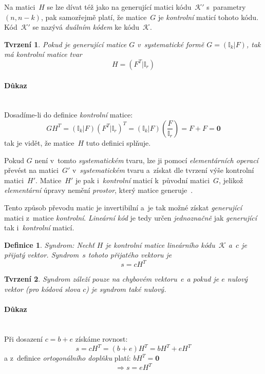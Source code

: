 \documentclass[thesis=M,czech,hidelinks]{FITthesis}[2012/06/26]
\newcommand{\0}{{\textcolor[gray]{0.75}{0}}}
\newtheorem{tvrzeni}{Tvrzení}
\newtheorem{definice}{Definice}
\begin{document}
Na matici~$H$ se lze dívat též jako na generující matici kódu~$\mathcal{K}'$
s~parametry~$(n,n-k)$, pak samozřejmě platí, že matice~$G$ je \emph{kontrolní}
maticí tohoto kódu. Kód~$\mathcal{K}'$ se nazývá \emph{duálním kódem} ke
kódu~$\mathcal{K}$.

\begin{tvrzeni}
    Pokud je \emph{generující} matice $G$ v~systematické formě
    $G=(\mathbb{I}_k|F)$, tak má \emph{kontrolní} matice tvar
    $$ H=(F^T|\mathbb{I}_r) $$
\end{tvrzeni}


\paragraph{Důkaz} \hfil \\
Dosadíme-li do definice \emph{kontrolní} matice:
$$
    G H^T = (\mathbb{I}_k|F)(F^T|\mathbb{I}_r)^T =
    (\mathbb{I}_k|F)(\frac{F}{\mathbb{I}_r}) = F + F = \textbf{0}
$$
tak je vidět, že matice~$H$ tuto definici splňuje.

Pokud $G$ není v~tomto \emph{systematickém} tvaru, lze ji pomocí
\emph{elementárních operací} převést na matici~$G'$ v~\emph{systematickém} tvaru
a~získat dle tvrzení výše kontrolní matici~$H'$. Matice~$H'$ je pak
i~\emph{kontrolní} maticí k~původní matici~$G$, jelikož \emph{elementární}
úpravy nemění \emph{prostor}, který matice generuje~\cite{Adamek}.

Tento způsob převodu matic je invertibilní a~je tak možné získat
\emph{generující} matici z~matice \emph{kontrolní}. \emph{Lineární kód} je tedy
určen \emph{jednoznačně} jak \emph{generující} tak i~\emph{kontrolní} maticí.

\begin{definice}{Syndrom:}
    Nechť $H$ je \emph{kontrolní} matice \emph{lineárního} kódu~$\mathcal{K}$
    a~$c$ je přijatý vektor. \emph{Syndrom}~$s$ tohoto přijatého vektoru je
    $$ s = c H^T $$
\end{definice}

\begin{tvrzeni}
    \emph{Syndrom} záleží pouze na chybovém vektoru~$e$ a pokud je $e$ nulový
    vektor (pro kódová slova $c$) je syndrom také \emph{nulový}.
\end{tvrzeni}


\paragraph{Důkaz} \hfil \\
Při dosazení $c=b+e$ získáme rovnost:
$$ s = c H^T = (b+e)H^T = b H^T + e H^T $$
a z~definice \emph{ortogonálního doplňku} platí: $ b H^T = \textbf{0} $
$$ \Rightarrow s = e H^T $$
\end{document}
